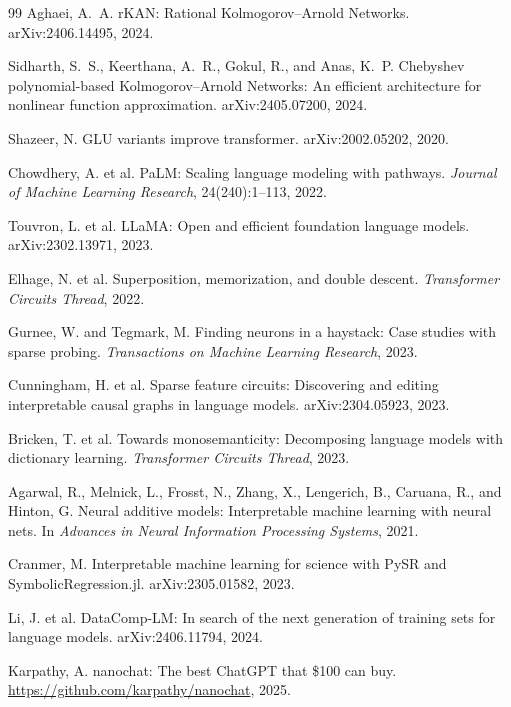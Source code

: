 \documentclass[11pt]{article}
\begin{document}
\begin{thebibliography}{99}
Aghaei, A.~A. rKAN: Rational Kolmogorov--Arnold Networks. arXiv:2406.14495, 2024.

Sidharth, S.~S., Keerthana, A.~R., Gokul, R., and Anas, K.~P. Chebyshev polynomial-based Kolmogorov--Arnold Networks: An efficient architecture for nonlinear function approximation. arXiv:2405.07200, 2024.

Shazeer, N. GLU variants improve transformer. arXiv:2002.05202, 2020.

Chowdhery, A. et al. PaLM: Scaling language modeling with pathways. \emph{Journal of Machine Learning Research}, 24(240):1--113, 2022.

Touvron, L. et al. LLaMA: Open and efficient foundation language models. arXiv:2302.13971, 2023.

Elhage, N. et al. Superposition, memorization, and double descent. \emph{Transformer Circuits Thread}, 2022.

Gurnee, W. and Tegmark, M. Finding neurons in a haystack: Case studies with sparse probing. \emph{Transactions on Machine Learning Research}, 2023.

Cunningham, H. et al. Sparse feature circuits: Discovering and editing interpretable causal graphs in language models. arXiv:2304.05923, 2023.

Bricken, T. et al. Towards monosemanticity: Decomposing language models with dictionary learning. \emph{Transformer Circuits Thread}, 2023.

Agarwal, R., Melnick, L., Frosst, N., Zhang, X., Lengerich, B., Caruana, R., and Hinton, G. Neural additive models: Interpretable machine learning with neural nets. In \emph{Advances in Neural Information Processing Systems}, 2021.

Cranmer, M. Interpretable machine learning for science with PySR and SymbolicRegression.jl. arXiv:2305.01582, 2023.

Li, J. et al. DataComp-LM: In search of the next generation of training sets for language models. arXiv:2406.11794, 2024.

Karpathy, A. nanochat: The best ChatGPT that \$100 can buy. \url{https://github.com/karpathy/nanochat}, 2025.


\end{thebibliography}
\end{document}

